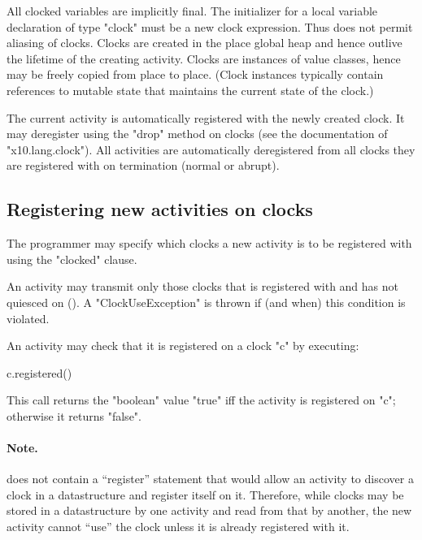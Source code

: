 All clocked variables are implicitly final. The initializer for a
local variable declaration of type \xcd"clock" must be a new clock
expression. Thus \Xten{} does not permit aliasing of clocks.
Clocks are created in the place global heap and hence outlive the
lifetime of the creating activity.  Clocks are instances of value
classes, hence may be freely copied from place to
place. (Clock instances typically contain references to mutable state
that maintains the current state of the clock.)

The current activity is automatically registered with the newly
created clock.  It may deregister using the \xcd"drop" method on
clocks (see the documentation of \xcd"x10.lang.clock"). All activities
are automatically deregistered from all clocks they are registered
with on termination (normal or abrupt).

\subsection{Registering new activities on clocks}
\label{sec:clock:register}

The programmer may specify which clocks a new activity is to be
registered with using the \xcd"clocked" clause.

An activity may transmit only those clocks that is registered with and
has not quiesced on (). 
A \xcd"ClockUseException" is
thrown if (and when) this condition is violated.

An activity may check that it is registered on a clock \xcd"c" by
executing:
\begin{xten}
c.registered()
\end{xten}
\noindent This call returns the \xcd"boolean" value \xcd"true" iff the
activity is registered on \xcd"c"; otherwise it returns \xcd"false".

\paragraph{Note.} 
\Xten{} does not contain a ``register'' statement that would allow an
activity to discover a clock in a datastructure and register itself on
it. Therefore, while clocks may be stored in a datastructure by one
activity and read from that by another, the new activity cannot
``use'' the clock unless it is already registered with it.


